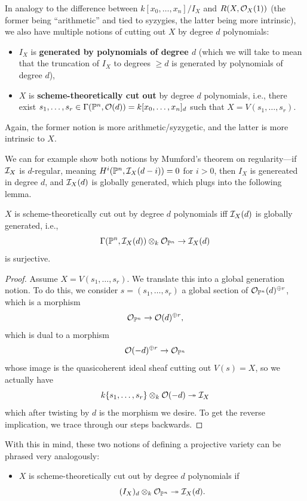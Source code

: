 \documentclass[12pt]{article}
\begin{document}
\begin{itemize}
    In analogy to the difference between $k[x_0,\dots,x_n]/I_X$ and $R(X,\mathcal{O}_X(1))$ (the former being ``arithmetic'' and tied to syzygies, the latter being more intrinsic), we also have multiple notions of cutting out $X$ by degree $d$ polynomials:

    \begin{defn}
    \begin{itemize}
        \item $I_X$ is \textbf{generated by polynomials of degree $d$} (which we will take to mean that the truncation of $I_X$ to degrees $\geq d$ is generated by polynomials of degree $d$),
        \item $X$ is \textbf{scheme-theoretically cut out} by degree $d$ polynomials, i.e., there exist $s_1,\dots,s_r\in \Gamma(\mathbb{P}^n,\mathcal{O}(d))=k[x_0,\dots,x_n]_d$ such that $X=V(s_1,\dots,s_r)$.
    \end{itemize}
    \end{defn}
    

    Again, the former notion is more arithmetic/syzygetic, and the latter is more intrinsic to $X$.
    
    We can for example show both notions by Mumford's theorem on regularity---if $\mathcal{I}_X$ is $d$-regular, meaning $H^i(\mathbb{P}^n,\mathcal{I}_X(d-i))=0$ for $i>0$, then $I_X$ is genereated in degree $d$, and $\mathcal{I}_X(d)$ is globally generated, which plugs into the following lemma.

    \begin{lem}
        $X$ is scheme-theoretically cut out by degree $d$ polynomials iff $\mathcal{I}_X(d)$ is globally generated, i.e.,
        \[\Gamma(\mathbb{P}^n,\mathcal{I}_X(d)) \otimes_k \mathcal{O}_{\mathbb{P}^n} \to \mathcal{I}_X(d)\]
        is surjective.
    \end{lem}
    \begin{proof}
        Assume $X=V(s_1,\dots,s_r)$. We translate this into a global generation notion. To do this, we consider $s=(s_1,\dots,s_r)$ a global section of $\mathcal{O}_{\mathbb{P}^n}(d)^{\oplus r}$, which is a morphism
        \[\mathcal{O}_{\mathbb{P}^n} \to \mathcal{O}(d)^{\oplus r},\]
        which is dual to a morphism
        \[\mathcal{O}(-d)^{\oplus r} \to \mathcal{O}_{\mathbb{P}^n}\]
        whose image is the quasicoherent ideal sheaf cutting out $V(s)=X$, so we actually have
        \[k\{s_1,\dots,s_r\} \otimes_k \mathcal{O}(-d) \twoheadrightarrow \mathcal{I}_X\]
        which after twisting by $d$ is the morphism we desire. To get the reverse implication, we trace through our steps backwards.
    \end{proof}

    \begin{rmk}
        With this in mind, these two notions of defining a projective variety can be phrased very analogously:
        \begin{itemize}
            \item $X$ is scheme-theoretically cut out by degree $d$ polynomials if
            \[ (I_X)_d \otimes_k \mathcal{O}_{\mathbb{P}^n} \twoheadrightarrow \mathcal{I}_X(d).\]


\end{itemize}
\end{rmk}
\end{itemize}
\end{document}
